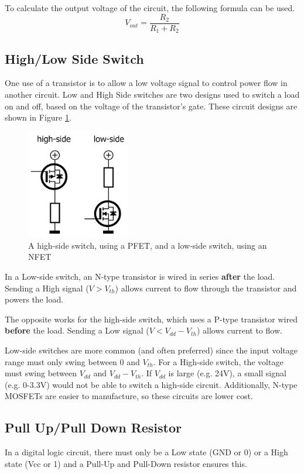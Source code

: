 \documentclass{article}
\begin{document}
To calculate the output voltage of the circuit, the following formula can be used. 
$$
V_{out} = \frac{R_{2}}{R_{1} + R_{2}}
$$

\subsection{High/Low Side Switch}

One use of a transistor is to allow a low voltage signal to control power flow in another circuit. Low and High Side switches are two
designs used to switch a load on and off, based on the voltage of the transistor's gate. These circuit designs are shown in Figure \ref{fig:sideswitch}.

\begin{figure} [h]
    \centering
    \includegraphics[width=0.4\textwidth]{img/high_low_switch.png}
    \caption{A high-side switch, using a PFET, and a low-side switch, using an NFET }
    \label{fig:sideswitch}
\end{figure}

In a Low-side switch, an N-type transistor is wired in series \textbf{after} the load. Sending a High signal ($V > V_{th}$) allows current to flow through the
transistor and powers the load.

The opposite works for the high-side switch, which uses a P-type transistor wired \textbf{before} the load. Sending a Low signal ($V < V_{dd} - V_{th}$) 
allows current to flow.

Low-side switches are more common (and often preferred) since the input voltage range must only swing between 0 and $V_{th}$. For a High-side switch, the 
voltage must swing between $V_{dd}$ and $V_{dd} - V_{th}$. If $V_{dd}$ is large (e.g. 24V), a small signal (e.g. 0-3.3V) would not be able to switch
a high-side circuit. Additionally, N-type MOSFETs are easier to manufacture, so these circuits are lower cost.

\subsection{Pull Up/Pull Down Resistor}
In a digital logic circuit, there must only be a Low state (GND or 0) or a High state (Vcc or 1) and a Pull-Up and Pull-Down resistor ensures this. 
\end{document}
